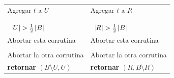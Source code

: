 \begin{algorithm}[tb]
\begin{algorithmic}[1]
\begin{tabular}{@{}>{\raggedright\arraybackslash}p{6.9cm}||>{\raggedright\arraybackslash}p{5.3cm}@{}}
		\STATE	\hspace*{3\algorithmicindent}Agregar $t$ a $U$                                                                            & \hspace*{2\algorithmicindent}Agregar $t$ a $R$\rightbrace{3}{\parbox[l]{0.3\textwidth}{$\bigo{\size{U_{\lijp{}}}}$ o \\ $\bigo{\size{R_{\lijp{}}}}$}}\\
		\STATE	\hspace*{2\algorithmicindent}\algorithmicendfor                                                                           & \hspace*{\algorithmicindent}\algorithmicendfor\\
		\STATE	\hspace*{\algorithmicindent}\algorithmicendfor\label{alg:line-handle-state-loopend}                                       & \algorithmicendfor\\
		\STATE	\hspace*{\algorithmicindent}\algorithmicif\ $\left\lvert U \right\rvert>\frac{1}{2}\left\lvert B \right\rvert$ \algorithmicthen                               & \algorithmicif\ $\left\lvert R \right\rvert>\frac{1}{2}\left\lvert B \right\rvert$ \algorithmicthen\rightbrace{5}{$\bigo{1}$}\\
		\STATE	\hspace*{2\algorithmicindent}Abortar esta corrutina                                                                       & \hspace*{\algorithmicindent}Abortar esta corrutina\\
		\STATE	\hspace*{\algorithmicindent}\algorithmicendif                                                                             & \algorithmicendif\\
		\STATE	\hspace*{\algorithmicindent}Abortar la otra corrutina                                                                     & Abortar la otra corrutina \\
		\STATE	\hspace*{\algorithmicindent}\textbf{retornar} $(B\setminus U,U)$\label{alg:line-return}                                    & \textbf{retornar} $(R,B\setminus R)$\\
	\end{tabular}\setlength{\itemsep}{0cm}%

\end{algorithmic}
\end{algorithm}
